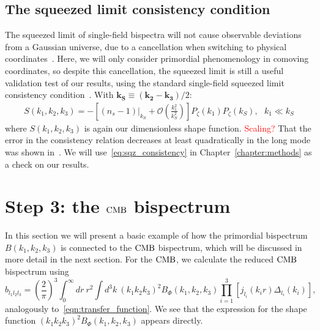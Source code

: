     \subsection{The squeezed limit consistency condition}
The squeezed limit of single-field bispectra will not cause
observable deviations from a Gaussian universe,
due to a cancellation when switching to physical coordinates~\cite{Cabass_2016}.
Here, we will only consider primordial phenomenology
in comoving coordinates, so despite this cancellation,
the squeezed limit is still a useful validation test of our results,
using the standard single-field squeezed limit consistency condition~\cite{sqz_consistency,not_so_sqz}.
With $\mathbf{k_S}\equiv\left(\mathbf{k_2}-\mathbf{k_3}\right)/2 $:
\begin{align}\label{eq:sqz_consistency}
    S(k_1,k_2,k_3) = -\left[(n_s-1)|_{k_S}+\mathcal{O}\left(\frac{k_1^2}{k_S^2}\right)\right]P_{\zeta}(k_1)P_{\zeta}(k_S),
\ \ \  k_1\ll k_S
\end{align}
where $S(k_1,k_2,k_3)$ is again our dimensionless shape function.
\textcolor{red}{Scaling?}
That the error in the consistency relation decreases at least quadratically
in the long mode was shown in~\cite{not_so_sqz}.
We will use~\eqref{eq:sqz_consistency} in Chapter~\ref{chapter:methods}
as a check on our results.


\section{Step 3: the $\text{CMB}$ bispectrum}
    In this section we will present a basic example of how the primordial bispectrum
    $B(k_1, k_2, k_3)$ is connected to the $\text{CMB}$ bispectrum, which will be discussed in more
    detail in the next section.
    For the $\text{CMB}$, we calculate the reduced $\text{CMB}$ bispectrum using~\cite{FergShell_2}
    \begin{equation}
    \label{eq:reduced_cmb}
    b_{l_1l_2l_3} = \left(\frac{2}{\pi}\right)^3\int_{0}^{\infty}dr~r^2
        \int d^3k~(k_1k_2k_3)^2 B_{\Phi}(k_1,k_2,k_3)\prod_{i=1}^{3}\left[j_{l_i}(k_ir)\Delta_{l_i}(k_i)\right],
    \end{equation}
    analogously to~\eqref{eqn:transfer_function}.
    We see that the expression for the shape function $(k_1k_2k_3)^2 B_{\Phi}(k_1,k_2,k_3)$ appears directly.


